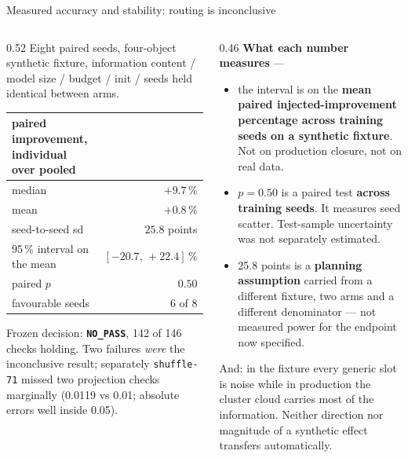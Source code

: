 \documentclass[aspectratio=169,10pt]{beamer}
\newcommand{\warn}[1]{\textcolor{warn}{#1}}
\begin{document}
\begin{frame}{Measured accuracy and stability: routing is inconclusive}
  \begin{columns}[T]
    \begin{column}{0.52\textwidth}
      {\footnotesize Eight paired seeds, four-object synthetic fixture, information
      content / model size / budget / init / seeds held identical between arms.}
      \begin{center}\footnotesize
      \begin{tabular}{@{}lr@{}}
        \toprule
        paired improvement, individual over pooled & \\
        \midrule
        median & $+9.7\,\%$ \\
        mean & $+0.8\,\%$ \\
        seed-to-seed sd & $25.8$ points \\
        95\,\% interval on the mean & $[-20.7,\,+22.4]\,\%$ \\
        paired $p$ & $0.50$ \\
        favourable seeds & 6 of 8 \\
        \bottomrule
      \end{tabular}
      \end{center}
      {\footnotesize Frozen decision: \textbf{\texttt{NO\_PASS}}, 142 of 146 checks
      holding. Two failures \emph{were} the inconclusive result; separately
      \texttt{shuffle-71} missed two projection checks marginally (0.0119 vs 0.01;
      absolute errors well inside 0.05).}
    \end{column}
    \begin{column}{0.46\textwidth}
      {\footnotesize\textbf{What each number measures} ---}
      \begin{itemize}\footnotesize
        \item the interval is on the \textbf{mean paired injected-improvement percentage
          across training seeds on a synthetic fixture}. Not on production closure, not
          on real data.
        \item $p=0.50$ is a paired test \textbf{across training seeds}. It measures
          seed scatter. \warn{Test-sample uncertainty was not separately estimated.}
        \item 25.8 points is a \textbf{planning assumption} carried from a different
          fixture, two arms and a different denominator --- \warn{not measured power for
          the endpoint now specified.}
      \end{itemize}
      {\footnotesize\warn{And: in the fixture every generic slot is noise while in
      production the cluster cloud carries most of the information. Neither direction
      nor magnitude of a synthetic effect transfers automatically.}}
    \end{column}
  \end{columns}
\end{frame}
\end{document}
